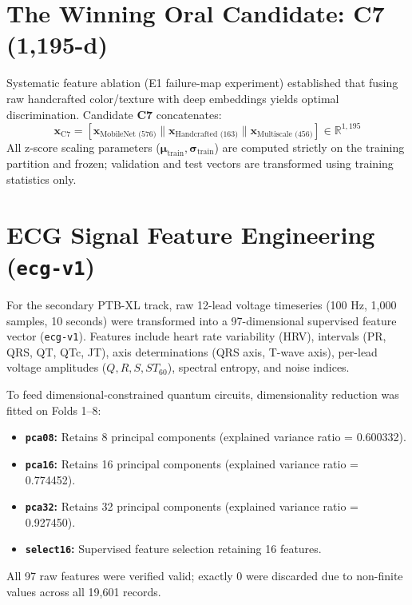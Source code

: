 \documentclass[11pt,a4paper]{report}
\begin{document}
\section{The Winning Oral Candidate: C7 (1,195-d)}
Systematic feature ablation (E1 failure-map experiment) established that fusing raw handcrafted color/texture with deep embeddings yields optimal discrimination. Candidate \textbf{C7} concatenates:
\begin{equation}
  \mathbf{x}_\text{C7} = \left[ \mathbf{x}_\text{MobileNet (576)} \parallel \mathbf{x}_\text{Handcrafted (163)} \parallel \mathbf{x}_\text{Multiscale (456)} \right] \in \mathbb{R}^{1,195}
\end{equation}
All z-score scaling parameters ($\boldsymbol{\mu}_\text{train}, \boldsymbol{\sigma}_\text{train}$) are computed strictly on the training partition and frozen; validation and test vectors are transformed using training statistics only.

\section{ECG Signal Feature Engineering (\texttt{ecg-v1})}
For the secondary PTB-XL track, raw 12-lead voltage timeseries (100 Hz, 1,000 samples, 10 seconds) were transformed into a 97-dimensional supervised feature vector (\texttt{ecg-v1}). Features include heart rate variability (HRV), intervals (PR, QRS, QT, QTc, JT), axis determinations (QRS axis, T-wave axis), per-lead voltage amplitudes ($Q, R, S, ST_{60}$), spectral entropy, and noise indices.

To feed dimensional-constrained quantum circuits, dimensionality reduction was fitted on Folds 1--8:
\begin{itemize}
  \item \textbf{\texttt{pca08}:} Retains 8 principal components (explained variance ratio = 0.600332).
  \item \textbf{\texttt{pca16}:} Retains 16 principal components (explained variance ratio = 0.774452).
  \item \textbf{\texttt{pca32}:} Retains 32 principal components (explained variance ratio = 0.927450).
  \item \textbf{\texttt{select16}:} Supervised feature selection retaining 16 features.
\end{itemize}
All 97 raw features were verified valid; exactly 0 were discarded due to non-finite values across all 19,601 records.

\end{document}

